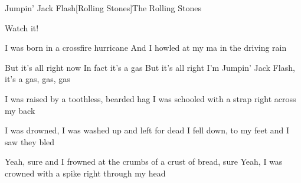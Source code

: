 \begin{Song}{Jumpin' Jack Flash}[Rolling Stones]{The Rolling Stones}

\begin{Verse}
Watch it!
\espaceInterStrophe

I was born in a crossfire hurricane
And I howled at my ma in the driving rain
\end{Verse}
\espaceInterStrophe

\begin{Chorus}
But it's all right now
In fact it's a gas
But it's all right
I'm Jumpin' Jack Flash, it's a gas, gas, gas
\end{Chorus}
\espaceInterStrophe

\begin{Verse}
I was raised by a toothless, bearded hag
I was schooled with a strap right across my back
\end{Verse}
\espaceInterStrophe

\tochorus
\espaceInterStrophe

\begin{Verse}
I was drowned, I was washed up and left for dead
I fell down, to my feet and I saw they bled
\espaceInterStrophe

Yeah, sure and I frowned at the crumbs of a crust of bread, sure
Yeah, I was crowned with a spike right through my head
\end{Verse}
\espaceInterStrophe

\tochorus
\espaceInterStrophe

\vfill

\end{Song}



